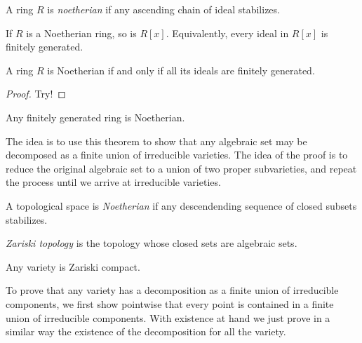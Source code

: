 \begin{definition}
\label{definition-noetherian-ring}
A ring $R$ is {\it noetherian}
if any ascending chain of ideal stabilizes.
\end{definition}

\begin{theorem}
\label{theorem-hilberts-basis}
If $R$ is a Noetherian ring, so is $R[x]$.
Equivalently, every ideal in $R[x]$ is
finitely generated.
\end{theorem}

\begin{lemma}
\label{lemma-noeth-iff-ideal-finit-gener}
A ring $R$ is Noetherian
if and only if
all its ideals are finitely generated.
\end{lemma}

\begin{proof}
Try!
\end{proof}

\begin{theorem}
\label{theorem-hilberts-basis-misha}
Any finitely generated ring is Noetherian.
\end{theorem}

\noindent
The idea is to use this theorem
to show that any algebraic set may be
decomposed
as a finite union of irreducible varieties.
The idea of the proof is to reduce the
original algebraic set
to a union of two proper subvarieties, and
repeat the process until we arrive at
irreducible varieties.

\begin{definition}
\label{definition-noeth-topol-space}
A topological space is {\it Noetherian}
if any descendending sequence of closed
subsets stabilizes.
\end{definition}

\begin{definition}
\label{definition-zariski-topology}
{\it Zariski topology} is the topology
whose closed sets are algebraic sets.
\end{definition}

\begin{exercise}[Misha]
\label{exercise-varie-zaris-compa}
Any variety is Zariski compact.
\end{exercise}

\noindent
To prove that any variety has a decomposition
as a finite union of irreducible components,
we first show pointwise that every point
is contained in a finite union of irreducible
components.
With existence at hand we just prove
in a similar way the existence of the
decomposition
for all the variety.

